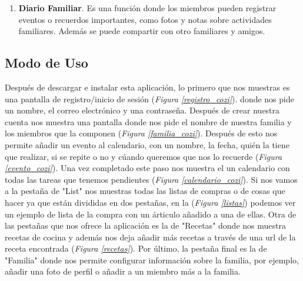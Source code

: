 \documentclass{article}
\begin{document}
\begin{enumerate}
    \begin{enumerate}
        \item Organizador de Menús. Facilita organizar las comidas con antelación y evita el estrés diario de decidir qué cocinar. 
        \item Recetas Integradas. Puedes guardar y organizar recetas directamente en la aplicación y con solo un clic. 
        \item Sincronización con el calendario. Los menús planificados pueden sincronizarse con el calendario para que toda la familia lo vea. 
    \end{enumerate}
    \item \textbf{Diario Familiar}. Es una función donde los miembros pueden registrar eventos o recuerdos importantes, como fotos y notas sobre actividades familiares. 
    Además se puede compartir con otro familiares y amigos.
\end{enumerate}

\subsection{Modo de Uso}
Después de descargar e instalar esta aplicación, lo primero que nos muestras es una pantalla de registro/inicio de sesión (\textit{Figura \ref{registro_cozi}}).
donde nos pide un nombre, el correo electrónico y una contraseña. Después de crear nuestra cuenta nos muestra una pantalla donde nos pide 
el nombre de nuestra familia y los miembros que la componen (\textit{Figura \ref{familia_cozi}}). Después de esto nos permite añadir un evento al calendario, con
un nombre, la fecha, quién la tiene que realizar, si se repite o no y cúando queremos que nos lo recuerde (\textit{Figura \ref{evento_cozi}}). Una vez completado este 
paso nos muestra el un calendario con todas las tareas que tenemos pendientes (\textit{Figura \ref{calendario_cozi}}). Si nos vamos a la pestaña de "List"
nos muestras todas las listas de compras o de cosas que hacer ya que están divididas en dos pestañas, en la (\textit{Figura \ref{listas}}) podemos ver un ejemplo de lista 
de la compra con un árticulo añadido a una de ellas. Otra de las pestañas que nos ofrece la aplicación es la de "Recetas" donde nos muestra recetas de cocina y además nos deja 
añadir más recetas a través de una url de la receta encontrada (\textit{Figura \ref{recetas}}). Por último, la pestaña final es la de "Familia" donde nos permite configurar información sobre la familia, por ejemplo, 
añadir una foto de perfil o añadir a un miembro más a la familia. 
\end{document}
